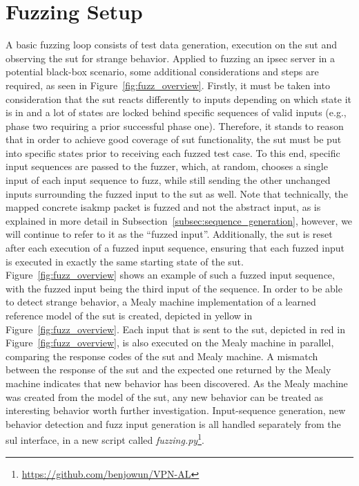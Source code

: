 \section{Fuzzing Setup} \label{sec:fuzz_intro}
A basic fuzzing loop consists of test data generation, execution on the \ac{sut} and observing the \ac{sut} for strange behavior. Applied to fuzzing an \ac{ipsec} server in a potential black-box scenario, some additional considerations and steps are required, as seen in Figure~\ref{fig:fuzz_overview}. Firstly, it must be taken into consideration that the \ac{sut} reacts differently to inputs depending on which state it is in and a lot of states are locked behind specific sequences of valid inputs (e.g., phase two requiring a prior successful phase one). Therefore, it stands to reason that in order to achieve good coverage of \ac{sut} functionality, the \ac{sut} must be put into specific states prior to receiving each fuzzed test case. To this end, specific input sequences are passed to the fuzzer, which, at random, chooses a single input of each input sequence to fuzz, while still sending the other unchanged inputs surrounding the fuzzed input to the \ac{sut} as well.
Note that technically, the mapped concrete \ac{isakmp} packet is fuzzed and not the abstract input, as is explained in more detail in Subsection~\ref{subsec:sequence_generation}, however, we will continue to refer to it as the ``fuzzed input''.
Additionally, the \ac{sut} is reset after each execution of a fuzzed input sequence, ensuring that each fuzzed input is executed in exactly the same starting state of the \ac{sut}. Figure~\ref{fig:fuzz_overview} shows an example of such a fuzzed input sequence, with the fuzzed input being the third input of the sequence. In order to be able to detect strange behavior, a Mealy machine implementation of a learned reference model of the \ac{sut} is created, depicted in yellow in Figure~\ref{fig:fuzz_overview}. Each input that is sent to the \ac{sut}, depicted in red in Figure~\ref{fig:fuzz_overview}, is also executed on the Mealy machine in parallel, comparing the response codes of the \ac{sut} and Mealy machine. A mismatch between the response of the \ac{sut} and the expected one returned by the Mealy machine indicates that new behavior has been discovered. As the Mealy machine was created from the model of the \ac{sut}, any new behavior can be treated as interesting behavior worth further investigation. Input-sequence generation, new behavior detection and fuzz input generation is all handled separately from the \ac{sul} interface, in a new script called \emph{fuzzing.py}\footnote{\url{https://github.com/benjowun/VPN-AL}}.

